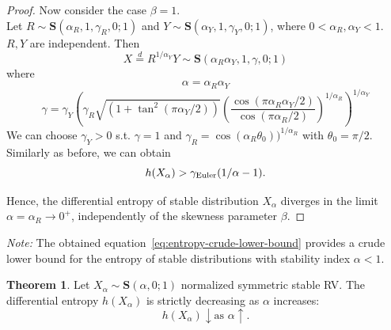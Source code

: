 \documentclass{article}
\theoremstyle{definition}
\newtheorem{theorem}[definition]{Theorem}
\begin{document}
\begin{proof}
Now consider the case \(\beta=1\).\\
Let \(R\sim\mathbf{S}(\alpha_R,1,\gamma_R,0;1)\) and \(Y\sim\mathbf{S}(\alpha_Y,1,\gamma_Y,0;1)\), where \(0<\alpha_R,\alpha_Y<1\). \(R,Y\) are independent. Then
\[
X\overset{d}{=}R^{1/\alpha_Y}Y\sim\mathbf{S}(\alpha_R \alpha_Y,1,\gamma,0;1)
\]
where
\[
\alpha=\alpha_R\alpha_Y
\]
\[
\gamma=\gamma_Y\left( \gamma_R\sqrt{(1+\tan^2(\pi \alpha_Y/2))} \left( \frac{\cos(\pi \alpha_R \alpha_Y / 2 )}{\cos(\pi\alpha_R/2)} \right)^{1/\alpha_R} \right)^{1/\alpha_Y}
\]
We can choose \(\gamma_Y>0\) s.t. \(\gamma=1\) and \(\gamma_R=\cos (\alpha_R\theta_0))^{1/\alpha_R}\) with \(\theta_0=\pi/2\).
Similarly as before, we can obtain
\[
h(X_\alpha)>\gamma_{\rm Euler}(1/\alpha-1).
\]

Hence, the differential entropy of stable distribution \(X_\alpha\) diverges in the limit \(\alpha=\alpha_R\to 0^+\), independently of the skewness parameter \(\beta\).
\end{proof}
\textit{Note:} The obtained equation~\ref{eq:entropy-crude-lower-bound} provides a crude lower bound for the entropy of stable distributions with stability index \(\alpha<1\). 

\begin{theorem}
    Let \(X_\alpha \sim \mathbf{S}(\alpha, 0; 1)\) normalized symmetric stable RV. The differential entropy \(h(X_\alpha)\) is strictly decreasing as \(\alpha\) increases:
    \begin{equation}
        h(X_\alpha) \downarrow \text{as }\alpha\uparrow. 
    \end{equation}
\end{theorem}
\end{document}
